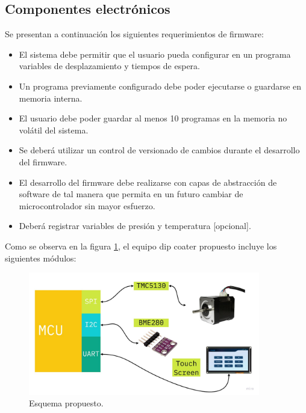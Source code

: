 \subsection{Componentes electrónicos}


Se presentan a continuación los siguientes requerimientos de firmware:

\begin{itemize}

\item El sistema debe permitir que el usuario pueda configurar en un programa variables de desplazamiento y tiempos de espera.
\item Un programa previamente configurado debe poder ejecutarse o guardarse en memoria interna.
\item El usuario debe poder guardar al menos 10 programas en la memoria no volátil del sistema.
\item Se deberá utilizar un control de versionado de cambios durante el desarrollo del firmware.
\item El desarrollo del firmware debe realizarse con capas de abstracción de software de tal manera que permita en un futuro cambiar de microcontrolador sin mayor esfuerzo.
\item Deberá registrar variables de presión y temperatura [opcional].

\end{itemize}



Como se observa en la figura \ref{fig:equipo_propuesto}, el equipo dip coater  propuesto incluye los siguientes módulos: 

\begin{figure}[ht]
\centering 
\includegraphics[width=0.9\textwidth]{./Figures/cap2_esquema_propuesto.jpg}
\caption{Esquema propuesto.}
\label{fig:equipo_propuesto}
\end{figure}




